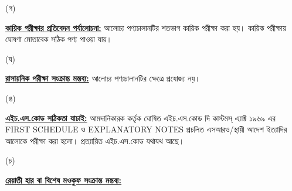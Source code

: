 \documentclass[12pt]{article}
\begin{document}
\begin{minipage}[t]{0.05\linewidth}
\hspace{1em}
\end{minipage}
\begin{minipage}[t]{0.05\linewidth}
(গ)
\end{minipage}
\begin{minipage}[t]{0.90\linewidth}
\underline{\textbf{কায়িক পরীক্ষার প্রতিবেদন পর্যালোচনা:}}
আলোচ্য পণ্যচালানটির শতভাগ কায়িক পরীক্ষা করা হয়। কায়িক
পরীক্ষায় ঘোষণা মোতাবেক সঠিক
পণ্য পাওয়া যায়।
\\
\end{minipage}
\begin{minipage}[t]{0.05\linewidth}
\hspace{1em}
\end{minipage}
\begin{minipage}[t]{0.05\linewidth}
(ঘ)
\end{minipage}
\begin{minipage}[t]{0.90\linewidth}
\underline{\textbf{রাসায়নিক পরীক্ষা সংক্রান্ত মন্তব্য:}}
আলোচ্য পণ্যচালানটির ক্ষেত্রে প্রযোজ্য নয়।
\\
\end{minipage}
\begin{minipage}[t]{0.05\linewidth}
\hspace{1em}
\end{minipage}
\begin{minipage}[t]{0.05\linewidth}
(ঙ)
\end{minipage}
\begin{minipage}[t]{0.90\linewidth}
\underline{\textbf{এইচ.এস.কোড সঠিকতা যাচাই:}}
আমদানিকারক কর্তৃক ঘোষিত এইচ.এস.কোড দি কাস্টমস্ এ্যাক্ট ১৯৬৯ এর FIRST SCHEDULE ও
EXPLANATORY NOTES প্রচলিত এসআরও/স্থায়ী আদেশ ইত্যাদির আলোকে পরীক্ষা করা হলো।
প্রত্যায়িত এইচ.এস.কোড যথাযথ আছে।
\\
\end{minipage}
\begin{minipage}[t]{0.05\linewidth}
\hspace{1em}
\end{minipage}
\begin{minipage}[t]{0.05\linewidth}
(চ)
\end{minipage}
\begin{minipage}[t]{0.90\linewidth}
\underline{\textbf{রেয়াতী হার বা বিশেষ মওকুফ সংক্রান্ত মন্তব্য:}}
\end{minipage}
\begin{minipage}[t]{0.1\linewidth}
\hspace{1em}
\end{minipage}
\end{document}
